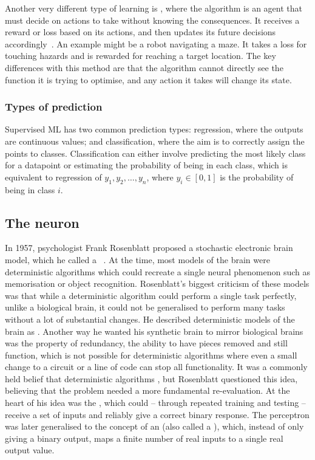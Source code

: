 Another very different type of learning is , where the algorithm is an agent that must decide on actions to take without knowing the consequences.
It receives a reward or loss based on its actions, and then updates its future decisions accordingly~\autocite[2]{alom2018}.
An example might be a robot navigating a maze.
It takes a loss for touching hazards and is rewarded for reaching a target location.
The key differences with this method are that the algorithm cannot directly see the function it is trying to optimise, and any action it takes will change its state.

\subsubsection{Types of prediction}

Supervised ML has two common prediction types: regression, where the outputs are continuous values; and classification, where the aim is to correctly assign the points to classes.
Classification can either involve predicting the most likely class for a datapoint or estimating the probability of being in each class, which is equivalent to regression of \(y_1, y_2, \dots, y_n\), where \(y_i \in [0, 1]\) is the probability of being in class \(i\).

\subsection{The neuron}

In 1957, psychologist Frank Rosenblatt proposed a stochastic electronic brain model, which he called a ~\autocite{rosenblatt1957}.
At the time, most models of the brain were deterministic algorithms which could recreate a single neural phenomenon such as memorisation or object recognition.
Rosenblatt's biggest criticism of these models was that while a deterministic algorithm could perform a single task perfectly, unlike a biological brain, it could not be generalised to perform many tasks without a lot of substantial changes.
He described deterministic models of the brain as .
Another way he wanted his synthetic brain to mirror biological brains was the property of redundancy, the ability to have pieces removed and still function, which is not possible for deterministic algorithms where even a small change to a circuit or a line of code can stop all functionality.
It was a commonly held belief that deterministic algorithms , but Rosenblatt questioned this idea, believing that the problem needed a more fundamental re-evaluation.
At the heart of his idea was the , which could -- through repeated training and testing -- receive a set of inputs and reliably give a correct binary response.
The perceptron was later generalised to the concept of an  (also called a ), which, instead of only giving a binary output, maps a finite number of real inputs to a single real output value.

